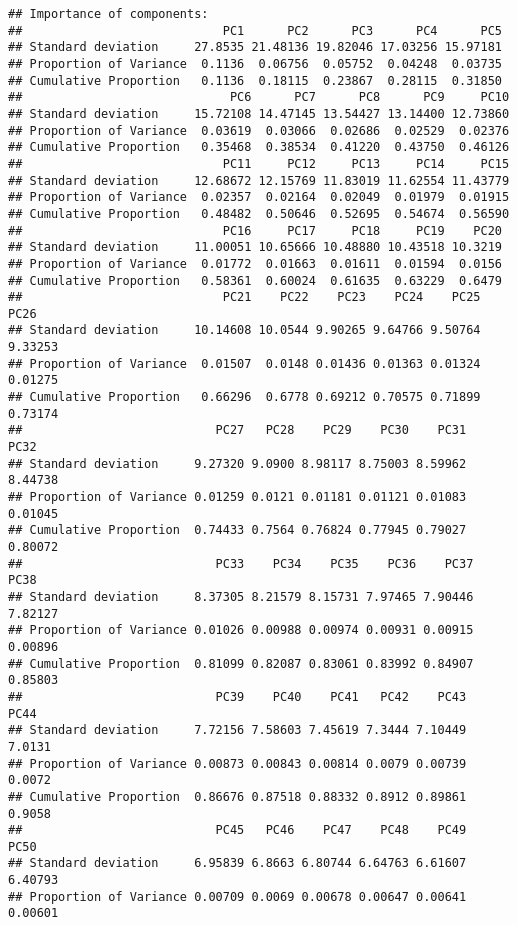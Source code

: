 \documentclass[]{article}
\begin{document}
\begin{verbatim}
## Importance of components:
##                            PC1      PC2      PC3      PC4      PC5
## Standard deviation     27.8535 21.48136 19.82046 17.03256 15.97181
## Proportion of Variance  0.1136  0.06756  0.05752  0.04248  0.03735
## Cumulative Proportion   0.1136  0.18115  0.23867  0.28115  0.31850
##                             PC6      PC7      PC8      PC9     PC10
## Standard deviation     15.72108 14.47145 13.54427 13.14400 12.73860
## Proportion of Variance  0.03619  0.03066  0.02686  0.02529  0.02376
## Cumulative Proportion   0.35468  0.38534  0.41220  0.43750  0.46126
##                            PC11     PC12     PC13     PC14     PC15
## Standard deviation     12.68672 12.15769 11.83019 11.62554 11.43779
## Proportion of Variance  0.02357  0.02164  0.02049  0.01979  0.01915
## Cumulative Proportion   0.48482  0.50646  0.52695  0.54674  0.56590
##                            PC16     PC17     PC18     PC19    PC20
## Standard deviation     11.00051 10.65666 10.48880 10.43518 10.3219
## Proportion of Variance  0.01772  0.01663  0.01611  0.01594  0.0156
## Cumulative Proportion   0.58361  0.60024  0.61635  0.63229  0.6479
##                            PC21    PC22    PC23    PC24    PC25    PC26
## Standard deviation     10.14608 10.0544 9.90265 9.64766 9.50764 9.33253
## Proportion of Variance  0.01507  0.0148 0.01436 0.01363 0.01324 0.01275
## Cumulative Proportion   0.66296  0.6778 0.69212 0.70575 0.71899 0.73174
##                           PC27   PC28    PC29    PC30    PC31    PC32
## Standard deviation     9.27320 9.0900 8.98117 8.75003 8.59962 8.44738
## Proportion of Variance 0.01259 0.0121 0.01181 0.01121 0.01083 0.01045
## Cumulative Proportion  0.74433 0.7564 0.76824 0.77945 0.79027 0.80072
##                           PC33    PC34    PC35    PC36    PC37    PC38
## Standard deviation     8.37305 8.21579 8.15731 7.97465 7.90446 7.82127
## Proportion of Variance 0.01026 0.00988 0.00974 0.00931 0.00915 0.00896
## Cumulative Proportion  0.81099 0.82087 0.83061 0.83992 0.84907 0.85803
##                           PC39    PC40    PC41   PC42    PC43   PC44
## Standard deviation     7.72156 7.58603 7.45619 7.3444 7.10449 7.0131
## Proportion of Variance 0.00873 0.00843 0.00814 0.0079 0.00739 0.0072
## Cumulative Proportion  0.86676 0.87518 0.88332 0.8912 0.89861 0.9058
##                           PC45   PC46    PC47    PC48    PC49    PC50
## Standard deviation     6.95839 6.8663 6.80744 6.64763 6.61607 6.40793
## Proportion of Variance 0.00709 0.0069 0.00678 0.00647 0.00641 0.00601

\end{verbatim}
\end{document}
